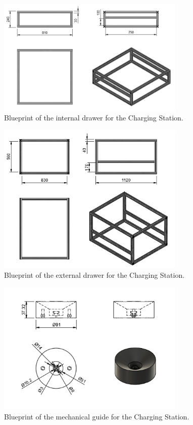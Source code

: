 \begin{figure}[H]
    \centering
    \includegraphics[width=0.8\textwidth]{PLANOS/PLANOS_CAJON_INTERNO_1.png}
    \caption{Blueprint of the internal drawer for the Charging Station.}
    \label{fig:cajon_interno}
\end{figure}


\begin{figure}[H]
    \centering
    \includegraphics[width=0.8\textwidth]{PLANOS/PLANOS_CAJON_EXTERNO_1.png}
    \caption{Blueprint of the external drawer for the Charging Station.}
    \label{fig:cajon_externo}
\end{figure}


\begin{figure}[H]
    \centering
    \includegraphics[width=0.8\textwidth]{PLANOS/PLANO_GUIAS_MECANICAS.png}
    \caption{Blueprint of the mechanical guide for the Charging Station.}
    \label{fig:guias_mecanicas}
\end{figure}




